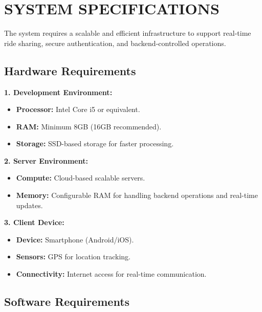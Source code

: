 \documentclass[10pt,a4paper]{report}
\begin{document}
\section{\textbf{SYSTEM SPECIFICATIONS}}
\large\justify
The system requires a scalable and efficient infrastructure to support real-time ride sharing, secure authentication, and backend-controlled operations.

\subsection{Hardware Requirements}

\vspace{0.5em}
\noindent \textbf{1. Development Environment:}
\begin{itemize}
    \item \textbf{Processor:} Intel Core i5 or equivalent.
    \item \textbf{RAM:} Minimum 8GB (16GB recommended).
    \item \textbf{Storage:} SSD-based storage for faster processing.
\end{itemize}

\vspace{0.5em}
\noindent \textbf{2. Server Environment:}
\begin{itemize}
    \item \textbf{Compute:} Cloud-based scalable servers.
    \item \textbf{Memory:} Configurable RAM for handling backend operations and real-time updates.
\end{itemize}

\vspace{0.5em}
\noindent \textbf{3. Client Device:}
\begin{itemize}
    \item \textbf{Device:} Smartphone (Android/iOS).
    \item \textbf{Sensors:} GPS for location tracking.
    \item \textbf{Connectivity:} Internet access for real-time communication.
\end{itemize}

\subsection{Software Requirements}
\end{document}
